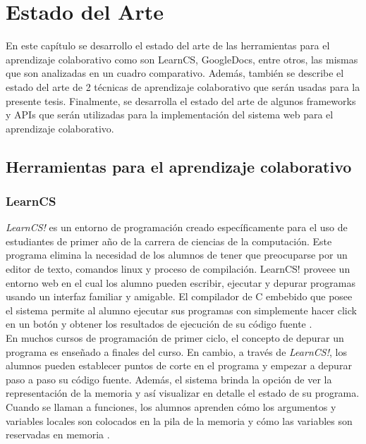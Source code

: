 \chapter{Estado del Arte}
En este capítulo se desarrollo el estado del arte de las herramientas para el aprendizaje colaborativo como son LearnCS, GoogleDocs, entre otros, las mismas que son analizadas en un cuadro comparativo. Además, también se describe el estado del arte de 2 técnicas de aprendizaje colaborativo que serán usadas para la presente tesis. Finalmente, se desarrolla el estado del arte de algunos frameworks y APIs que serán utilizadas para la implementación del sistema web para el aprendizaje colaborativo.

\section{Herramientas para el aprendizaje colaborativo}

\subsection{LearnCS}
\emph{LearnCS!} es un entorno de programación creado específicamente para el uso de estudiantes de primer año de la carrera de ciencias de la computación. Este programa elimina la necesidad de los alumnos de tener que preocuparse por un editor de texto, comandos linux y proceso de compilación. LearnCS! proveee un entorno web en el cual los alumno pueden escribir, ejecutar y depurar programas usando un interfaz familiar y amigable. El compilador de C embebido que posee el sistema permite al alumno ejecutar sus programas con simplemente hacer click en un botón y obtener los resultados de ejecución de su código fuente \cite{lipman_learncs_2014}.\\

En muchos cursos de programación de primer ciclo, el concepto de depurar un programa es enseñado a finales del curso. En cambio, a través de \emph{LearnCS!}, los alumnos pueden establecer puntos de corte en el programa y empezar a depurar paso a paso su código fuente. Además, el sistema brinda la opción de ver la representación de la memoria y así visualizar en detalle el estado de su programa. Cuando se llaman a funciones, los alumnos aprenden cómo los argumentos y variables locales son colocados en la pila de la memoria y cómo las variables son reservadas en memoria \cite{lipman_learncs_2014}.\\


